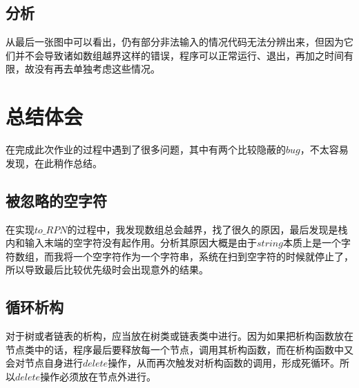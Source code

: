 \documentclass[UTF8]{ctexart}
\begin{document}
	\subsection{分析}\label{time_of_PrintLots}
	\indent 从最后一张图中可以看出，仍有部分非法输入的情况代码无法分辨出来，但因为它们并不会导致诸如数组越界这样的错误，程序可以正常运行、退出，再加之时间有限，故没有再去单独考虑这些情况。
	

	\section{总结体会}
	\indent 在完成此次作业的过程中遇到了很多问题，其中有两个比较隐蔽的$bug$，不太容易发现，在此稍作总结。
	\subsection{被忽略的空字符}
	\indent 在实现$to\_RPN$的过程中，我发现数组总会越界，找了很久的原因，最后发现是栈内和输入末端的空字符没有起作用。分析其原因大概是由于$string$本质上是一个字符数组，而我将一个空字符作为一个字符串，系统在扫到空字符的时候就停止了，所以导致最后比较优先级时会出现意外的结果。
	
	\subsection{循环析构}
	\indent 对于树或者链表的析构，应当放在树类或链表类中进行。因为如果把析构函数放在节点类中的话，程序最后要释放每一个节点，调用其析构函数，而在析构函数中又会对节点自身进行$delete$操作，从而再次触发对析构函数的调用，形成死循环。所以$delete$操作必须放在节点外进行。


\end{document}
